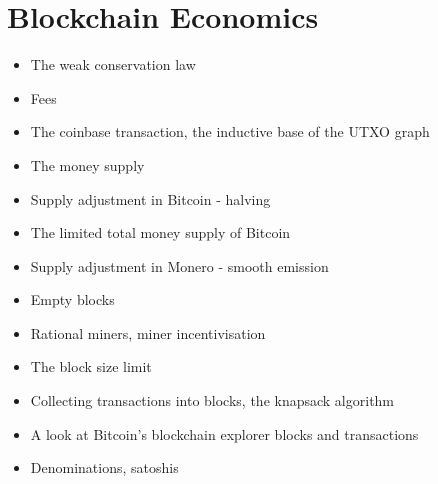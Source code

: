 \chapter{Blockchain Economics}\label{chapter.economics}

{\color{red}
\begin{itemize}
\item The weak conservation law
\item Fees
\item The coinbase transaction, the inductive base of the UTXO graph
\item The money supply
\item Supply adjustment in Bitcoin - halving
\item The limited total money supply of Bitcoin
\item Supply adjustment in Monero - smooth emission
\item Empty blocks
\item Rational miners, miner incentivisation
\item The block size limit
\item Collecting transactions into blocks, the knapsack algorithm
\item A look at Bitcoin's blockchain explorer blocks and transactions
\item Denominations, satoshis
\end{itemize}
}
